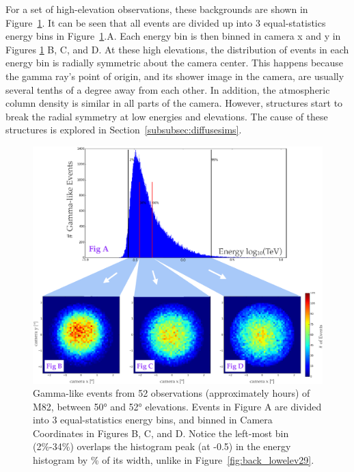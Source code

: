     For a set of high-elevation observations, these backgrounds are shown in Figure~\ref{fig:back_highelev}.
    It can be seen that all events are divided up into 3 equal-statistics energy bins in Figure~\ref{fig:back_highelev}.A.
    Each energy bin is then binned in camera x and y in Figures \ref{fig:back_highelev} B, C, and D.
    At these high elevations, the distribution of events in each energy bin is radially symmetric about the camera center.
    This happens because the gamma ray's point of origin, and its shower image in the camera, are usually several tenths of a degree away from each other.
    In addition, the atmospheric column density is similar in all parts of the camera.
    However, structures start to break the radial symmetry at low energies and elevations.
    The cause of these structures is explored in Section~\ref{subsubsec:diffusesims}.

    \begin{figure}[ht]
      \centering
      \includegraphics[width=\textwidth]{images/ctools/backgrounds_highelev.eps}
      \caption[FITS Background at \ang{50} Elevation]{
        Gamma-like events from 52 observations (approximately  hours) of M82, between \ang{50} and \ang{52} elevations.
        Events in Figure A are divided into 3 equal-statistics energy bins, and binned in Camera Coordinates in Figures B, C, and D.
        Notice the left-most bin (2\%-34\%) overlaps the histogram peak (at -0.5) in the energy histogram by \% of its width, unlike in Figure~\ref{fig:back_lowelev29}.
      }
      \label{fig:back_highelev}
    \end{figure}

